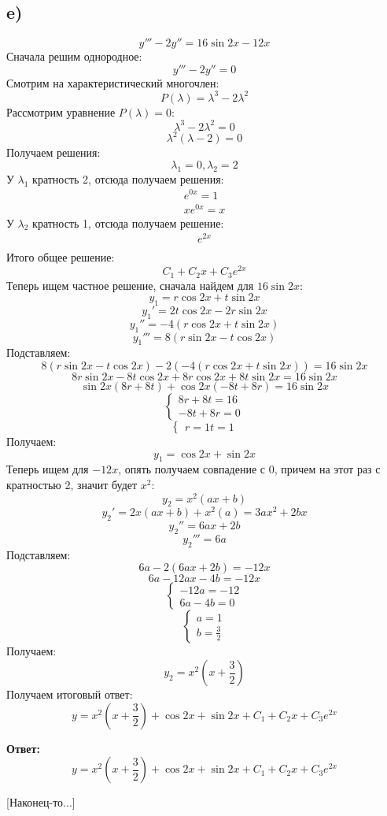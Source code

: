 \documentclass[a4paper, 12pt]{article}
\begin{document}
\subsection*{e)}
\[
y''' - 2y'' = 16 \sin 2x - 12x
\]
Сначала решим однородное:
\[
y''' - 2y''= 0
\]
Смотрим на характеристический многочлен:
\[
P(\lambda) = \lambda^3 - 2 \lambda^2 
\]
Рассмотрим уравнение $P(\lambda) = 0$:
\[
\lambda^3 - 2 \lambda^2  = 0
\]
\[
\lambda^2(\lambda - 2) = 0
\]
Получаем решения:
\[
\lambda_1 = 0, \lambda_2 = 2
\]
У $\lambda_1$ кратность 2, отсюда получаем решения:
\[
      \begin{gathered} 
e^{0x} = 1  \\
x e^{0x} = x
      \end{gathered} 
\]
У $\lambda_2$ кратность 1, отсюда получаем решение:
\[
      \begin{gathered} 
e^{2x} \\
      \end{gathered} 
\]
Итого общее решение:
\[
C_1 + C_2 x + C_3 e^{2x} 
\]
Теперь ищем частное решение, сначала найдем для $16\sin 2x$:
\[
y_1 = r \cos 2x + t \sin 2x 
\]
\[
y_1' = 2t \cos 2x - 2 r \sin 2x
\]
\[
y_1'' = -4(r \cos 2x + t \sin 2x) 
\]
\[
y_1''' = 8(r \sin 2x - t\cos 2x)
\]
Подставляем:
\[
 8(r \sin 2x - t\cos 2x) - 2(-4(r \cos 2x + t \sin 2x)) = 16 \sin 2x
\]
\[
8r \sin 2x - 8t \cos 2x + 8 r \cos 2x + 8 t \sin 2x = 16 \sin 2x
\]
\[
\sin 2x( 8r + 8t) + \cos 2x(-8t + 8r) = 16 \sin 2x
\]
\[
\begin{cases}
8r + 8t = 16 \\
-8t + 8r = 0
\end{cases}
\]
\[
\begin{cases}
r = 1
t = 1
\end{cases}
\]
Получаем:
\[
y_1 = \cos 2x + \sin 2x
\]
Теперь ищем для $-12x$, опять получаем совпадение с 0, причем на этот раз с кратностью 2, значит будет $x^2$:
\[
y_2 = x^2(ax + b) 
\]
\[
y_2' = 2x(ax + b) + x^2(a) = 3ax^2 + 2bx
\]
\[
y_2'' = 6ax + 2b
\]
\[
y_2''' = 6a
\]
Подставляем:
\[
6a - 2(6ax + 2b) =  - 12 x
\]
\[
6a - 12ax - 4b = -12 x
\]
\[
\begin{cases}
-12a = -12 \\
6a - 4b = 0
\end{cases}
\]
\[
\begin{cases}
a = 1\\
b = \frac{3}{2}
\end{cases}
\]
Получаем:
\[
y_2 = x^2(x + \frac{3}{2})
\]
Получаем итоговый ответ:
\[
y = x^2(x + \frac{3}{2}) + \cos 2x + \sin 2x + C_1 + C_2 x + C_3 e^{2x} 
\]
\begin{center}
\textbf{Ответ: } 
\[
y = x^2\left(x + \frac{3}{2}\right) + \cos 2x + \sin 2x + C_1 + C_2 x + C_3 e^{2x} 
\]
\end{center}
\begin{center}
[Наконец-то...]
\end{center}
\end{document}

